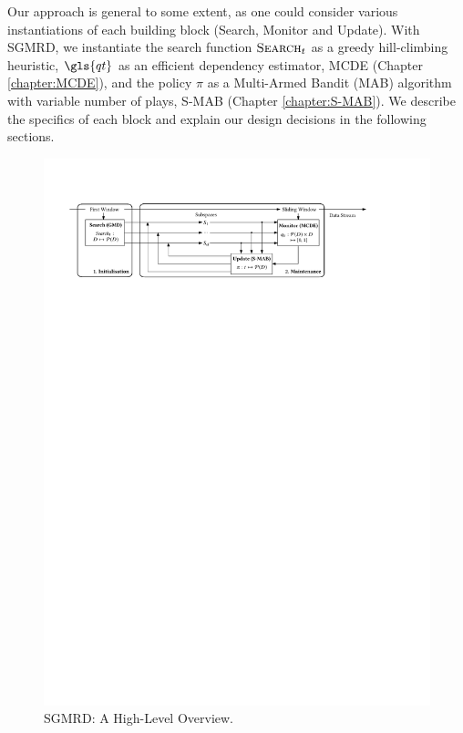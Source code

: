 Our approach is general to some extent, as one could consider various instantiations of each building block (Search, Monitor and Update). With SGMRD, we instantiate the search function $\textsc{Search}_t$ as a greedy hill-climbing heuristic,  $\gls{qt}$ as an efficient dependency estimator, MCDE (Chapter \ref{chapter:MCDE}), and the policy $\pi$ as a Multi-Armed Bandit (MAB) algorithm with variable number of plays, S-MAB (Chapter \ref{chapter:S-MAB}). We describe the specifics of each block and explain our design decisions in the following sections. 

\begin{figure}
	\centering
	\includegraphics[width=\linewidth]{part4-figures/SGMRD_workflow_small_2-compressed.pdf}
	\caption{\acrshort{SGMRD}: A High-Level Overview.} 
	\label{fig:SGMRD_workflow}
\end{figure} 

